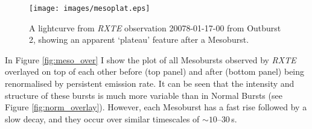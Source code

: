 \begin{figure}
  \centering
  \texttt{[image: images/mesoplat.eps]}
  \caption[A lightcurve from \textit{RXTE} observation 20078-01-17-00 from Outburst 2, showing an apparent `plateau' feature after a Mesoburst.]{\small A lightcurve from \textit{RXTE} observation 20078-01-17-00 from Outburst 2, showing an apparent `plateau' feature after a Mesoburst.}
  \label{fig:mesoplateau}
\end{figure}

\par In Figure \ref{fig:meso_over} I show the plot of all Mesobursts observed by \textit{RXTE} overlayed on top of each other before (top panel) and after (bottom panel) being renormalised by persistent emission rate.  It can be seen that the intensity and structure of these bursts is much more variable than in Normal Bursts (see Figure \ref{fig:norm_overlay}).  However, each Mesoburst has a fast rise followed by a slow decay, and they occur over similar timescales of $\sim10$--$30$\,s.

